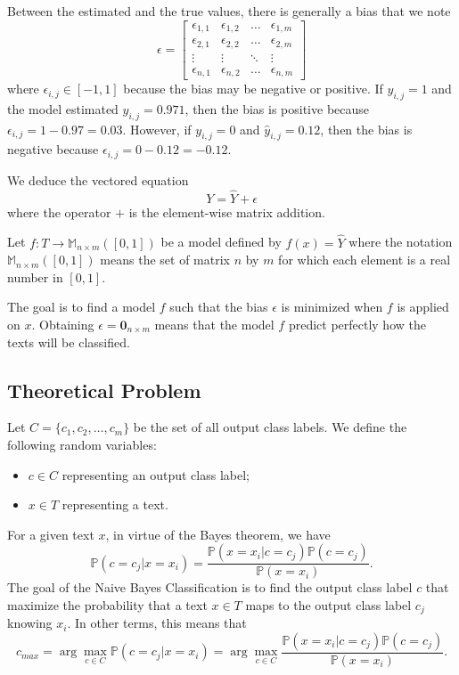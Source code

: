 \documentclass{article}
\begin{document}
Between the estimated and the true values, there is generally a bias that we note
\begin{equation} \label{eq:BiasMatrix}
\epsilon =\begin{bmatrix}
	    \epsilon_{1,1}      & \epsilon_{1,2}      & \ldots & \epsilon_{1,m} \\
	    \epsilon_{2,1} & \epsilon_{2,2} & \ldots & \epsilon_{2,m} \\
	    \vdots       & \vdots        & \ddots & \vdots \\
	    \epsilon_{n,1}  & \epsilon_{n,2}  & \ldots & \epsilon_{n,m}
	\end{bmatrix}
\end{equation}
where $\epsilon_{i,j} \in [-1, 1]$ because the bias may be negative or positive. If $y_{i,j} = 1$ and the model estimated $\widehat{y}_{i,j} = 0.971$, then the bias is positive because $\epsilon_{i,j} = 1 - 0.97 = 0.03$. However, if $y_{i,j} = 0$ and $\widehat{y}_{i,j} = 0.12$, then the bias is negative because $\epsilon_{i,j} = 0 - 0.12 = -0.12$.

We deduce the vectored equation 
\begin{equation}
	Y = \widehat{Y} + \epsilon
\end{equation}
where the operator $+$ is the element-wise matrix addition.

Let $f : T \longrightarrow \mathbb{M}_{n \times m}([0,1])$ be a model defined by $f(x) = \widehat{Y}$ where the notation $\mathbb{M}_{n \times m}([0,1])$ means the set of matrix $n$ by $m$ for which each element is a real number in $[0,1]$.

The goal is to find a model $f$ such that the bias $\epsilon$ is minimized when $f$ is applied on $x$. Obtaining $\epsilon = \mathbf{0}_{n \times m}$ means that the model $f$ predict perfectly how the texts will be classified.


\subsection{Theoretical Problem}
Let $C = \{c_1,c_2,\ldots, c_m\}$ be the set of all output class labels. We define the following random variables:
\begin{itemize}
	\item $c \in C$ representing an output class label;
	\item $x \in T$ representing a text.
\end{itemize}

For a given text $x$, in virtue of the Bayes theorem, we have
\begin{equation}
	\mathbb{P}(c = c_j | x = x_i) = \frac{\mathbb{P}(x = x_i | c = c_j)\mathbb{P}(c = c_j)}{\mathbb{P}(x = x_i)}.
\end{equation}
The goal of the Naive Bayes Classification is to find the output class label $c$ that maximize the probability that a text $x \in T$ maps to the output class label $c_j$ knowing $x_i$. In other terms, this means that
\begin{equation} \label{eq_CMax}
	c_{max} = \arg\max_{c \in C} \mathbb{P}(c = c_j | x = x_i) = \arg\max_{c \in C} \frac{\mathbb{P}(x = x_i | c = c_j)\mathbb{P}(c = c_j)}{\mathbb{P}(x = x_i)}.
\end{equation}
\end{document}
